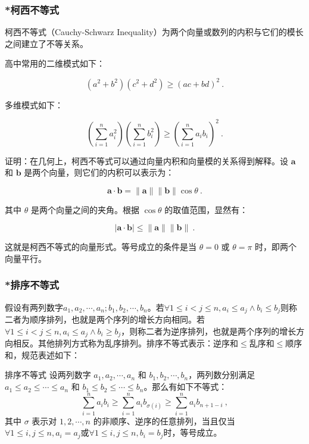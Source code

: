 {\subsubsection{*柯西不等式}

柯西不等式（Cauchy-Schwarz Inequality）为两个向量或数列的内积与它们的模长之间建立了不等关系。

高中常用的二维模式如下：

\begin{equation}
\left( a^2 + b^2\right) \left(c^2 + d^2 \right) \geq \left( ac+bd \right)^2~.
\end{equation}

多维模式如下：

\begin{equation}
\left( \sum_{i=1}^{n} a_i^2 \right) \left( \sum_{i=1}^{n} b_i^2 \right) \geq \left( \sum_{i=1}^{n} a_i b_i \right)^2~.
\end{equation}

证明：在几何上，柯西不等式可以通过向量内积和向量模的关系得到解释。设 $\mathbf{a}$ 和 $\mathbf{b}$ 是两个向量，则它们的内积可以表示为：

$$\mathbf{a} \cdot \mathbf{b} = \|\mathbf{a}\| \|\mathbf{b}\| \cos \theta~.$$

其中 $\theta$ 是两个向量之间的夹角。根据 $\cos \theta$ 的取值范围，显然有：

$$|\mathbf{a} \cdot \mathbf{b}| \leq \|\mathbf{a}\| \|\mathbf{b}\|~.$$

这就是柯西不等式的向量形式。等号成立的条件是当 $\theta = 0$ 或 $\theta = \pi$ 时，即两个向量平行。

\subsubsection{*排序不等式}

假设有两列数字$a_1,a_2,\cdots,a_n;b_1,b_2,\cdots,b_n$。若$\forall 1\leq i<j\leq n,a_i\leq a_j\land b_i\leq b_j$则称二者为顺序排列，也就是两个序列的增长方向相同。若$\forall 1\leq i<j\leq n,a_i\leq a_j\land b_i\geq b_j$，则称二者为逆序排列，也就是两个序列的增长方向相反。其他排列方式称为乱序排列。排序不等式表示：逆序和$\leq$乱序和$\leq$顺序和，规范表述如下：

\begin{theorem}{排序不等式}
设两列数字 $a_1, a_2, \cdots, a_n$ 和 $b_1, b_2, \cdots, b_n$，两列数分别满足 $a_1 \leq a_2 \leq \cdots \leq a_n$ 和 $b_1 \leq b_2 \leq \cdots \leq b_n$。那么有如下不等式：
\begin{equation}
\sum_{i=1}^n a_i b_i \geq \sum_{i=1}^n a_i b_{\sigma(i)} \geq \sum_{i=1}^n a_i b_{n+1-i}~,
\end{equation}
其中 $\sigma$ 表示对 ${1, 2, \cdots, n}$ 的非顺序、逆序的任意排列，当且仅当$\forall 1\leq i,j\leq n,a_i=a_j$或$\forall 1\leq i,j\leq n,b_i=b_j$时，等号成立。
\end{theorem}

}
